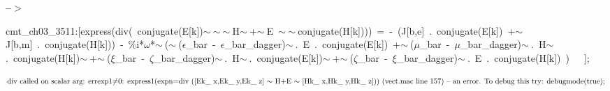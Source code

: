 \documentclass[fleqn]{article}
\begin{document}
\noindent
\begin{minipage}[t]{4.000000em}\color{red}\bfseries
 --\ensuremath{\ensuremath{>}}	
\end{minipage}
\begin{minipage}[t]{\textwidth}\color{blue}
cmt\_ch03\_3511:[express(div(\ conjugate(E[k])\ensuremath{\sim\ }\ensuremath{\sim\ }\ensuremath{\sim\ }H\ensuremath{\sim\ }+\ensuremath{\sim\ }E\ \ensuremath{\sim\ }\ensuremath{\sim\ }conjugate(H[k])))\ =\ -\ (J[b,e]\ .\ conjugate(E[k])\ +\ensuremath{\sim\ }J[b,m]\ .\ conjugate(H[k]))\ -\ \%i*\ensuremath{\omega}*\ensuremath{\sim\ }(\ensuremath{\sim\ }(\ensuremath{\epsilon}\_bar\ -\ \ensuremath{\epsilon}\_bar\_dagger)\ensuremath{\sim\ }.\ E\ .\ conjugate(E[k])\ +\ensuremath{\sim\ }(\ensuremath{\mu}\_bar\ -\ \ensuremath{\mu}\_bar\_dagger)\ensuremath{\sim\ }.\ H\ensuremath{\sim\ }.\ conjugate(H[k])\ensuremath{\sim\ }+\ensuremath{\sim\ }(\ensuremath{\xi}\_bar\ -\ \ensuremath{\zeta}\_bar\_dagger)\ensuremath{\sim\ }.\ H\ensuremath{\sim\ }.\ conjugate(E[k])\ensuremath{\sim\ }+\ensuremath{\sim\ }(\ensuremath{\zeta}\_bar\ -\ \ensuremath{\xi}\_bar\_dagger)\ensuremath{\sim\ }.\ E\ .\ conjugate(H[k])\ )\ \ \ ];
\end{minipage}
\[\displaystyle \mbox{}\\\mbox{%
div called on scalar arg: }\ensuremath{\mathrm{errexp1
}}\mbox{%
\ensuremath{\neq}0: express1(expn=div ([Ek\_ x,Ek\_ y,Ek\_ z] \ensuremath{\sim } H+E \ensuremath{\sim } [Hk\_ x,Hk\_ y,Hk\_ z])) (vect.mac line 157)
}\mbox{%
 -- an error. To debug this try: debugmode(true);}\mbox{}
\]
\end{document}
